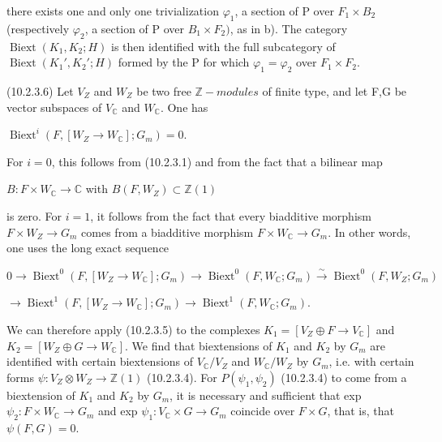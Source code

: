 \documentclass[11pt,twoside]{article}
\newcommand{\DFormula}[1]{%
  \par\smallskip\noindent\hspace*{0pt}\(\displaystyle #1\)\par\smallskip
}
\begin{document}
there exists one and only one trivialization \(\varphi _{1}\), a section of P over \(F_{1}\times B_{2}\) (respectively \(\varphi _{2}\), a section of P over \(B_{1}\times F_{2})\), as in b). The category \(\operatorname{Biext}(K_{1},K_{2};H)\) is then identified with the full subcategory of \(\operatorname{Biext}(K_{1}′,K_{2}′;H)\) formed by the P for which \(\varphi _{1}=\varphi _{2}\) over \(F_{1}\times F_{2}\).\par
\par\medskip
(10.2.3.6) Let \(V_{Z}\) and \(W_{Z}\) be two free \(\mathbb{Z}-modules\) of finite type, and let F,G be vector subspaces of \(V_{\mathbb{C}}\) and \(W_{\mathbb{C}}\). One has\par
\par\medskip
\DFormula{\operatorname{Biext}^{i}(F,[W_{Z}\to W_{\mathbb{C}}];G_{m})=0.}
\par\medskip
For \(i=0\), this follows from (10.2.3.1) and from the fact that a bilinear map\par
\par\medskip
\(B:F\times W_{\mathbb{C}}\to \mathbb{C}\)     with     \(B(F,W_{Z})\subset \mathbb{Z}(1)\)\par
\par\medskip
is zero. For \(i=1\), it follows from the fact that every biadditive morphism \(F\times W_{Z}\to G_{m}\) comes from a biadditive morphism \(F\times W_{\mathbb{C}}\to G_{m}\). In other words, one uses the long exact sequence\par
\par\medskip
\DFormula{0\to \operatorname{Biext}^{0}(F,[W_{Z}\to W_{\mathbb{C}}];G_{m})\to \operatorname{Biext}^{0}(F,W_{\mathbb{C}};G_{m})\xrightarrow{\sim}\operatorname{Biext}^{0}(F,W_{Z};G_{m})}
\DFormula{\to \operatorname{Biext}^{1}(F,[W_{Z}\to W_{\mathbb{C}}];G_{m})\to \operatorname{Biext}^{1}(F,W_{\mathbb{C}};G_{m}).}
\par\medskip
We can therefore apply (10.2.3.5) to the complexes \(K_{1}=[V_{Z}\oplus F\to V_{\mathbb{C}}]\) and \(K_{2}=[W_{Z}\oplus G\to W_{\mathbb{C}}]\). We find that biextensions of \(K_{1}\) and \(K_{2}\) by \(G_{m}\) are identified with certain biextensions of \(V_{\mathbb{C}}/V_{Z}\) and \(W_{\mathbb{C}}/W_{Z}\) by \(G_{m}\), i.e. with certain forms \(\psi :V_{Z}\otimes W_{Z}\to \mathbb{Z}(1)\) (10.2.3.4). For \(P(\psi _{1},\psi _{2})\) (10.2.3.4) to come from a biextension of \(K_{1}\) and \(K_{2}\) by \(G_{m}\), it is necessary and sufficient that exp \(\psi _{2}:F\times W_{\mathbb{C}}\to G_{m}\) and exp \(\psi _{1}:V_{\mathbb{C}}\times G\to G_{m}\) coincide over \(F\times G\), that is, that \(\psi (F,G)=0\).\par
\end{document}
